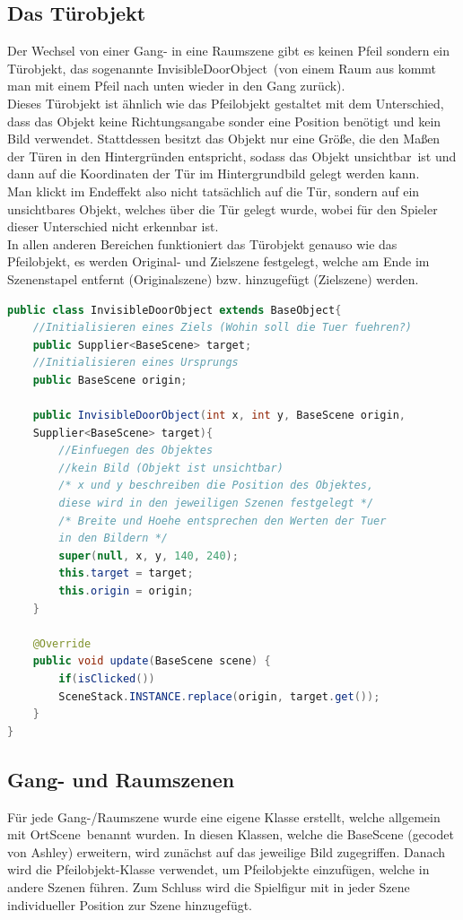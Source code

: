 \subsection{Das Türobjekt}
Der Wechsel von einer Gang- in eine Raumszene gibt es keinen Pfeil sondern ein Türobjekt, das sogenannte \glqq InvisibleDoorObject\grqq\ (von einem Raum aus kommt man mit einem Pfeil nach unten wieder in den Gang zurück). \\
Dieses Türobjekt ist ähnlich wie das Pfeilobjekt gestaltet mit dem Unterschied, dass das Objekt keine Richtungsangabe sonder eine Position benötigt und kein Bild verwendet. Stattdessen besitzt das Objekt nur eine Größe, die den Maßen der Türen in den Hintergründen entspricht, sodass das Objekt \glqq unsichtbar\grqq\ ist und dann auf die Koordinaten der Tür im Hintergrundbild gelegt werden kann. \\
Man klickt im Endeffekt also nicht tatsächlich auf die Tür, sondern auf ein unsichtbares Objekt, welches über die Tür gelegt wurde, wobei für den Spieler dieser Unterschied nicht erkennbar ist. \\
In allen anderen Bereichen funktioniert das Türobjekt genauso wie das Pfeilobjekt, es werden Original- und Zielszene festgelegt, welche am Ende im Szenenstapel entfernt (Originalszene) bzw. hinzugefügt (Zielszene) werden.

\begin{lstlisting}[caption=TürObject, label=lst:pfeilobject, captionpos=p, language=Java]
public class InvisibleDoorObject extends BaseObject{
	//Initialisieren eines Ziels (Wohin soll die Tuer fuehren?)
	public Supplier<BaseScene> target;
	//Initialisieren eines Ursprungs
	public BaseScene origin;
		
	public InvisibleDoorObject(int x, int y, BaseScene origin, 
	Supplier<BaseScene> target){
		//Einfuegen des Objektes
		//kein Bild (Objekt ist unsichtbar)
		/* x und y beschreiben die Position des Objektes, 
		diese wird in den jeweiligen Szenen festgelegt */
		/* Breite und Hoehe entsprechen den Werten der Tuer 
		in den Bildern */
		super(null, x, y, 140, 240);
		this.target = target;
		this.origin = origin;
	}
		
	@Override
	public void update(BaseScene scene) {
		if(isClicked())
		SceneStack.INSTANCE.replace(origin, target.get());
	}
}
\end{lstlisting}

\subsection{Gang- und Raumszenen}
Für jede Gang-/Raumszene wurde eine eigene Klasse erstellt, welche allgemein mit \glqq OrtScene\grqq\ benannt wurden. In diesen Klassen, welche die BaseScene (gecodet von Ashley) erweitern, wird zunächst auf das jeweilige Bild zugegriffen. Danach wird die Pfeilobjekt-Klasse verwendet, um Pfeilobjekte einzufügen, welche in andere Szenen führen. Zum Schluss wird die Spielfigur mit in jeder Szene individueller Position zur Szene hinzugefügt.

